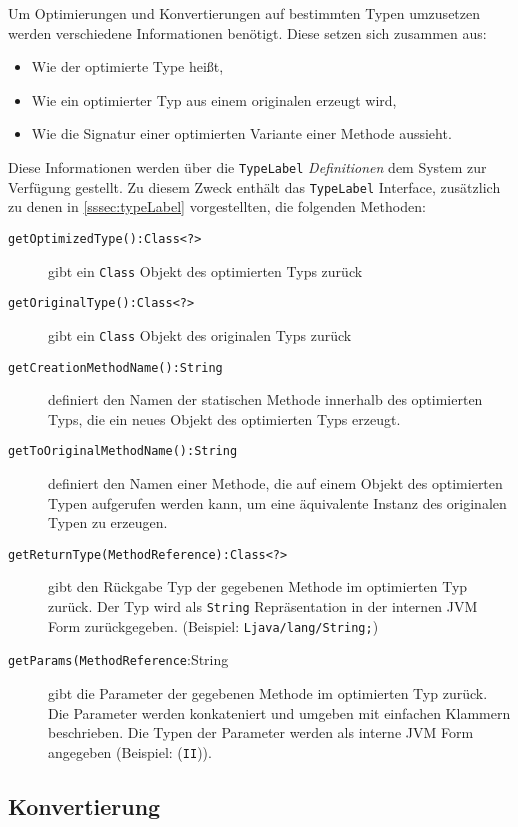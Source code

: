 Um Optimierungen und Konvertierungen auf bestimmten Typen umzusetzen werden verschiedene 
Informationen benötigt. Diese setzen sich zusammen aus:

\begin{itemize}
	\item Wie der optimierte Type heißt,
	\item Wie ein optimierter Typ aus einem originalen erzeugt wird,
	\item Wie die Signatur einer optimierten Variante einer Methode aussieht.
\end{itemize} 


Diese Informationen werden über die \texttt{TypeLabel} \textit{Definitionen} dem System zur Verfügung gestellt.
Zu diesem Zweck enthält das \texttt{TypeLabel} Interface, zusätzlich zu denen in \ref{sssec:typeLabel} 
vorgestellten, die folgenden Methoden: 

\begin{description}
	\item[\texttt{getOptimizedType():Class<?>}] gibt ein \texttt{Class} Objekt des optimierten Typs zurück
	\item[\texttt{getOriginalType():Class<?>}] gibt ein \texttt{Class} Objekt des originalen Typs zurück
	\item[\texttt{getCreationMethodName():String}] definiert den Namen der statischen Methode innerhalb des
	optimierten Typs, die ein neues Objekt des optimierten Typs erzeugt.
	\item[\texttt{getToOriginalMethodName():String}] definiert den Namen einer Methode, die auf einem Objekt
	des optimierten Typen aufgerufen werden kann, um eine äquivalente Instanz des originalen Typen
	zu erzeugen.
	\item[\texttt{getReturnType(MethodReference):Class<?>}] gibt den Rückgabe Typ der gegebenen 
	Methode im optimierten Typ zurück. Der Typ wird als \texttt{String} Repräsentation in der internen JVM Form zurückgegeben.
	(Beispiel: \texttt{Ljava/lang/String;})
	\item[\texttt{getParams(MethodReference}:String] gibt die Parameter der gegebenen Methode im optimierten
	Typ zurück. Die Parameter werden konkateniert und umgeben mit einfachen Klammern 
	beschrieben. Die Typen der Parameter werden als interne JVM Form angegeben (Beispiel: (\texttt{II})).
\end{description}

\subsection{Konvertierung}

